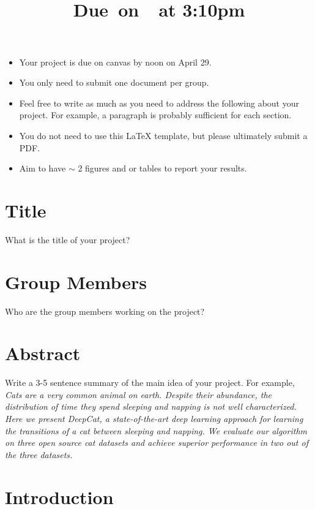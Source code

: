 \documentclass{article}
\title{
    \vspace{2in}
    \textmd{\textbf{\hmwkClass\hmwkTitle}}\\
    \normalsize\vspace{0.1in}\small{Due\ on\ \hmwkDueDate\ at 3:10pm}\\
    \vspace{3in}
}
\author{\hmwkAuthorName}
\date{}
\begin{document}

\begin{itemize}
\item Your project is due on canvas by noon on April 29. 
\item You only need to submit one document per group.
\item Feel free to write as much as you need to address the following about your project. For example, a paragraph is probably sufficient for each section. 
\item You do not need to use this LaTeX template, but please ultimately submit a PDF. 
\item Aim to have $\sim$ 2 figures and or tables to report your results. 
\end{itemize}

\section{Title}

What is the title of your project?

\section{Group Members}

Who are the group members working on the project? 

\section{Abstract}

Write a 3-5 sentence summary of the main idea of your project. For example, \\

\emph{Cats are a very common animal on earth. Despite their abundance, the distribution of time they spend sleeping and napping is not well characterized. Here we present DeepCat, a state-of-the-art deep learning approach for learning the transitions of a cat between sleeping and napping. We evaluate our algorithm on three open source cat datasets and achieve superior performance in two out of the three datasets.}

\section{Introduction}
\end{document}
